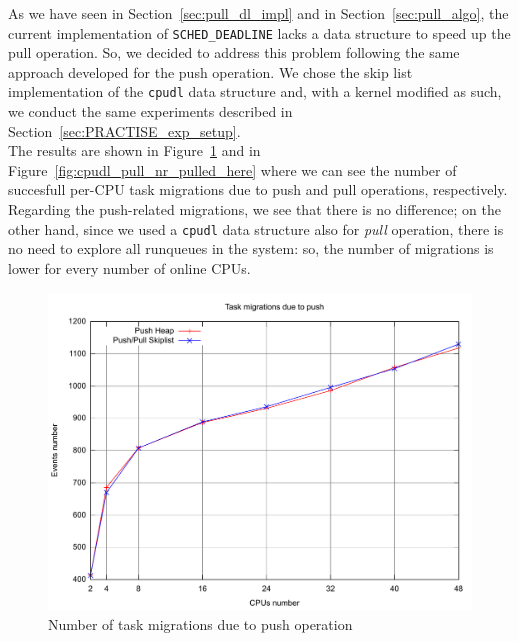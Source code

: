 As we have seen in Section~\ref{sec:pull_dl_impl} and in Section~\ref{sec:pull_algo}, 
the current implementation of \texttt{SCHED\_DEADLINE} lacks a data structure 
to speed up the pull operation. So, we decided to address this problem following 
the same approach developed for the push operation. We chose the skip list 
implementation of the \texttt{cpudl} data structure and, with a kernel modified
as such, we conduct the same experiments described in Section~\ref{sec:PRACTISE_exp_setup}.\\
The results are shown in Figure~\ref{fig:cpudl_pull_nr_pushed_away} and in 
Figure~\ref{fig:cpudl_pull_nr_pulled_here} where we can see
the number of succesfull per-CPU task migrations due to push and pull operations,
respectively. Regarding the push-related migrations, we see that there is
no difference; on the other hand, since we used a \texttt{cpudl}
data structure also for \emph{pull} operation, there is no need to 
explore all runqueues in the system: so, the number of migrations is lower
for every number of online CPUs.

\begin{figure}[htbp]
    \includegraphics[width=\columnwidth]{images/cpudl_pull_nr_pushed_away}
    \caption{Number of task migrations due to push operation}
    \label{fig:cpudl_pull_nr_pushed_away}
\end{figure}

